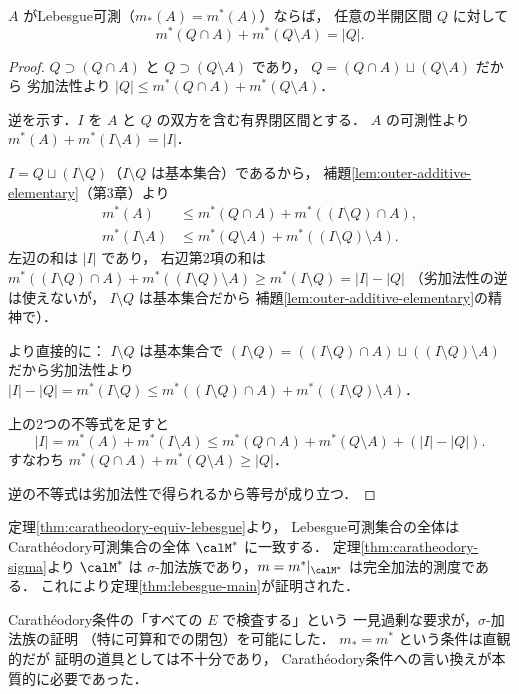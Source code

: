 \begin{lemma}\label{lem:cara-rectangle}
$A$ がLebesgue可測（$m_*(A) = m^*(A)$）ならば，
任意の半開区間 $Q$ に対して
\[
m^*(Q \cap A) + m^*(Q \setminus A) = |Q|.
\]
\end{lemma}
\begin{proof}
$Q \supset (Q \cap A)$ と $Q \supset (Q \setminus A)$ であり，
$Q = (Q \cap A) \sqcup (Q \setminus A)$ だから
劣加法性より $|Q| \le m^*(Q \cap A) + m^*(Q \setminus A)$．

逆を示す．$I$ を $A$ と $Q$ の双方を含む有界閉区間とする．
$A$ の可測性より $m^*(A) + m^*(I \setminus A) = |I|$．

$I = Q \sqcup (I \setminus Q)$（$I \setminus Q$ は基本集合）であるから，
補題\ref{lem:outer-additive-elementary}（第3章）より
\begin{align*}
m^*(A) &\le m^*(Q \cap A) + m^*((I \setminus Q) \cap A), \\
m^*(I \setminus A)
&\le m^*(Q \setminus A) + m^*((I \setminus Q) \setminus A).
\end{align*}
左辺の和は $|I|$ であり，
右辺第2項の和は
$m^*((I \setminus Q) \cap A) + m^*((I \setminus Q) \setminus A)
\ge m^*(I \setminus Q) = |I| - |Q|$
（劣加法性の逆は使えないが，
$I \setminus Q$ は基本集合だから
補題\ref{lem:outer-additive-elementary}の精神で）．

より直接的に：
$I \setminus Q$ は基本集合で
$(I \setminus Q) = ((I \setminus Q) \cap A) \sqcup ((I \setminus Q) \setminus A)$
だから劣加法性より
$|I| - |Q| = m^*(I \setminus Q)
\le m^*((I \setminus Q) \cap A) + m^*((I \setminus Q) \setminus A)$．

上の2つの不等式を足すと
\[
|I| = m^*(A) + m^*(I \setminus A)
\le m^*(Q \cap A) + m^*(Q \setminus A) + (|I| - |Q|).
\]
すなわち $m^*(Q \cap A) + m^*(Q \setminus A) \ge |Q|$．

逆の不等式は劣加法性で得られるから等号が成り立つ．
\end{proof}

\begin{corollary}
\label{cor:lebesgue-main-proof}
定理\ref{thm:caratheodory-equiv-lebesgue}より，
Lebesgue可測集合の全体は
Carath\'eodory可測集合の全体 $\calM^*$ に一致する．
定理\ref{thm:caratheodory-sigma}より
$\calM^*$ は $\sigma$-加法族であり，$m = m^*|_{\calM^*}$ は完全加法的測度である．
これにより定理\ref{thm:lebesgue-main}が証明された．
\end{corollary}

\begin{remark}
Carath\'eodory条件の「すべての $E$ で検査する」という
一見過剰な要求が，$\sigma$-加法族の証明
（特に可算和での閉包）を可能にした．
$m_* = m^*$ という条件は直観的だが
証明の道具としては不十分であり，
Carath\'eodory条件への言い換えが本質的に必要であった．
\end{remark}

